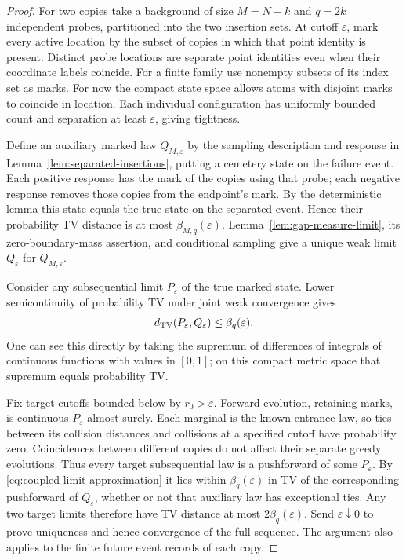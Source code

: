 \documentclass[11pt,letterpaper]{article}
\begin{document}
\begin{proof}
For two copies take a background of size $M=N-k$ and $q=2k$
independent probes, partitioned into the two insertion sets. At cutoff
$\varepsilon$, mark every active location by the subset of copies in
which that point identity is present. Distinct probe locations are
separate point identities even when their coordinate labels coincide.
For a finite family use
nonempty subsets of its index set as marks. For now the compact state
space allows atoms with disjoint marks to coincide in location.
Each individual configuration has uniformly bounded count and
separation at least $\varepsilon$, giving tightness.

Define an auxiliary marked law $Q_{M,\varepsilon}$ by the sampling
description and response in Lemma~\ref{lem:separated-insertions},
putting a cemetery state on the failure event. Each positive response
has the mark of the copies using that probe; each negative response
removes those copies from the endpoint's mark. By the deterministic
lemma this state equals the true state on the separated event. Hence
their probability TV distance is at most $\beta_{M,q}(\varepsilon)$.
Lemma~\ref{lem:gap-measure-limit}, its zero-boundary-mass assertion,
and conditional sampling give a unique weak limit
$Q_\varepsilon$ for $Q_{M,\varepsilon}$.

Consider any subsequential limit $P_\varepsilon$ of the true marked
state. Lower semicontinuity of probability TV under joint weak
convergence gives
\begin{equation}\label{eq:coupled-limit-approximation}
 d_{\rm TV}(P_\varepsilon,Q_\varepsilon)
       \le\beta_q(\varepsilon).
\end{equation}
One can see this directly by taking the supremum of differences of
integrals of continuous functions with values in $[0,1]$; on this
compact metric space that supremum equals probability TV.

Fix target cutoffs bounded below by $r_0>\varepsilon$.
Forward evolution, retaining marks, is continuous
$P_\varepsilon$-almost surely. Each marginal is the known entrance
law, so ties between its collision distances and collisions at a
specified cutoff have probability zero. Coincidences between different
copies do not affect their separate greedy evolutions. Thus every
target subsequential law is a pushforward of some $P_\varepsilon$.
By \eqref{eq:coupled-limit-approximation} it lies within
$\beta_q(\varepsilon)$ in TV of the corresponding pushforward of
$Q_\varepsilon$, whether or not that auxiliary law has exceptional
ties. Any two target limits therefore have TV distance at most
$2\beta_q(\varepsilon)$. Send $\varepsilon\downarrow0$ to prove
uniqueness and hence convergence of the full sequence. The argument
also applies to the finite future event records of each copy.


\end{proof}
\end{document}
